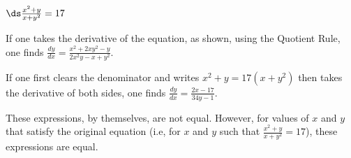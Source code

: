 {$\ds\frac{x^2+y}{x+y^2}=17$
}
{If one takes the derivative of the equation, as shown, using the Quotient Rule, one finds $\frac{dy}{dx}=\frac{x^2+2 x y^2-y}{2 x^2 y-x+y^2}$.

If one first clears the denominator and writes $x^2+y=17(x+y^2)$ then takes the derivative of both sides, one finds $\frac{dy}{dx}=  \frac{2x-17}{34y-1}$.

These expressions, by themselves, are not equal. However, for values of $x$ and $y$ that satisfy the original equation (i.e, for $x$ and $y$ such that $\frac{x^2+y}{x+y^2}=17$), these expressions are equal.
}
